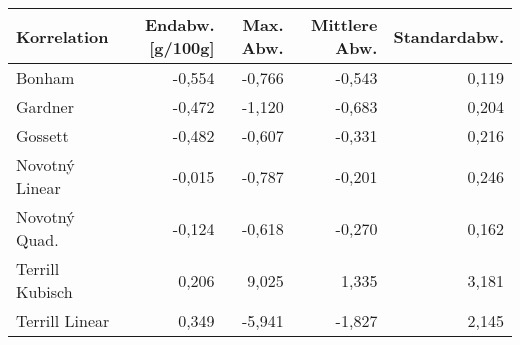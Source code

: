 \begin{tabular}{lrrrr}
\toprule
    Korrelation &  Endabw. [g/100g] &  Max. Abw. &  Mittlere Abw. &  Standardabw. \\
\midrule
         Bonham &            -0,554 &     -0,766 &         -0,543 &         0,119 \\
        Gardner &            -0,472 &     -1,120 &         -0,683 &         0,204 \\
        Gossett &            -0,482 &     -0,607 &         -0,331 &         0,216 \\
 Novotný Linear &            -0,015 &     -0,787 &         -0,201 &         0,246 \\
  Novotný Quad. &            -0,124 &     -0,618 &         -0,270 &         0,162 \\
Terrill Kubisch &             0,206 &      9,025 &          1,335 &         3,181 \\
 Terrill Linear &             0,349 &     -5,941 &         -1,827 &         2,145 \\
\bottomrule
\end{tabular}
